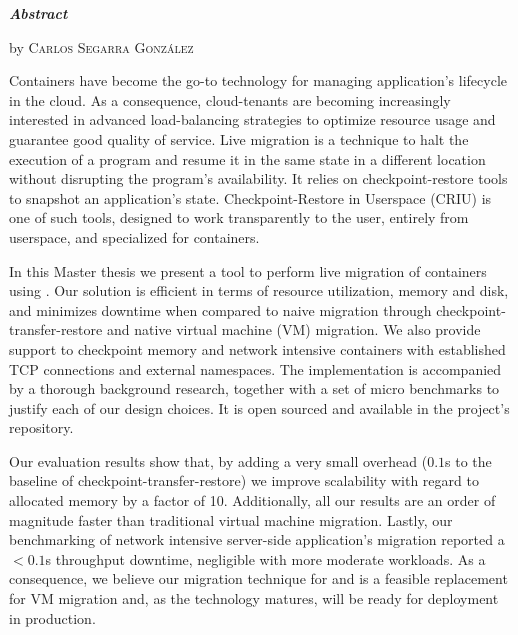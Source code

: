 \vspace*{1.50cm}
\begin{center}

    \LARGE
    \textit{\textbf{Abstract}} \label{sec:abstract}

    \vspace{0.5cm}

    \large
    \textbf{\titleEN}

    by \textsc{Carlos Segarra Gonz\'alez}
\end{center}

\vspace{0.5cm}

\normalsize
Containers have become the go-to technology for managing application's lifecycle in the cloud.
As a consequence, cloud-tenants are becoming increasingly interested in advanced load-balancing strategies to optimize resource usage and guarantee good quality of service.
Live migration is a technique to halt the execution of a program and resume it in the same state in a different location without disrupting the program's availability.
It relies on checkpoint-restore tools to snapshot an application's state.
Checkpoint-Restore in Userspace (CRIU) is one of such tools, designed to work transparently to the user, entirely from userspace, and specialized for containers.

In this Master thesis we present a tool to perform live migration of \runc containers using \criu.
Our solution is efficient in terms of resource utilization, memory and disk, and minimizes downtime when compared to naive migration through checkpoint-transfer-restore and native virtual machine (VM) migration.
We also provide support to checkpoint memory and network intensive containers with established TCP connections and external namespaces.
The implementation is accompanied by a thorough background research, together with a set of micro benchmarks to justify each of our design choices.
It is open sourced and available in the project's repository.

Our evaluation results show that, by adding a very small overhead ($0.1$s to the baseline of checkpoint-transfer-restore) we improve scalability with regard to allocated memory by a factor of 10.
Additionally, all our results are an order of magnitude faster than traditional virtual machine migration.
Lastly, our benchmarking of network intensive server-side application's migration reported a $< 0.1$s throughput downtime, negligible with more moderate workloads.
As a consequence, we believe our migration technique for \criu and \runc is a feasible replacement for VM migration and, as the technology matures, will be ready for deployment in production.


